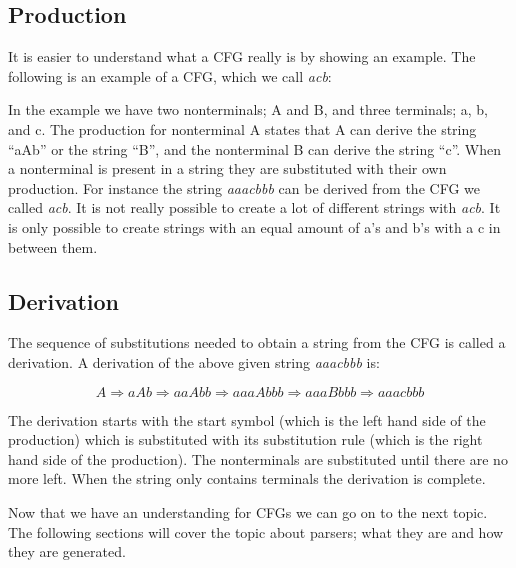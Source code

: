 \subsection{Production}
It is easier to understand what a CFG really is by showing an example. The following is an example of a CFG, which we call \textit{acb}:

\begin{center}
	\begin{ebnf}
	\end{ebnf}
\end{center}

In the example we have two nonterminals; A and B, and three terminals; a, b, and c. The production for nonterminal A states that A can derive the string ``aAb'' or the string ``B'', and the nonterminal B can derive the string ``c''. When a nonterminal is present in a string they are substituted with their own production. For instance the string \textit{aaacbbb} can be derived from the CFG we called \textit{acb}. It is not really possible to create a lot of different strings with \textit{acb}. It is only possible to create strings with an equal amount of a's and b's with a c in between them.

\subsection{Derivation}
The sequence of substitutions needed to obtain a string from the CFG is called a derivation.\cite[p. 100]{itttoc} A derivation of the above given string \textit{aaacbbb} is:

\[ 
A \Rightarrow aAb \Rightarrow aaAbb \Rightarrow aaaAbbb \Rightarrow aaaBbbb \Rightarrow aaacbbb 
\]

The derivation starts with the start symbol (which is the left hand side of the production) which is substituted with its substitution rule (which is the right hand side of the production). The nonterminals are substituted until there are no more left. When the string only contains terminals the derivation is complete.

Now that we have an understanding for CFGs we can go on to the next topic. The following sections will cover the topic about parsers; what they are and how they are generated.